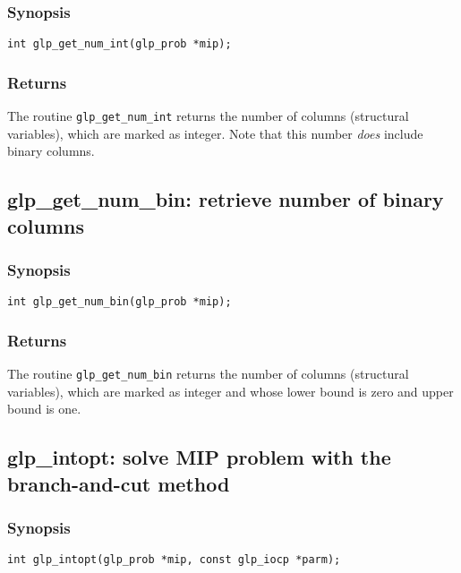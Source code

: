 \subsubsection*{Synopsis}

\begin{verbatim}
int glp_get_num_int(glp_prob *mip);
\end{verbatim}

\subsubsection*{Returns}

The routine \verb|glp_get_num_int| returns the number of columns
(structural variables), which are marked as integer. Note that this
number {\it does} include binary columns.

\subsection{glp\_get\_num\_bin: retrieve number of binary columns}

\subsubsection*{Synopsis}

\begin{verbatim}
int glp_get_num_bin(glp_prob *mip);
\end{verbatim}

\subsubsection*{Returns}

The routine \verb|glp_get_num_bin| returns the number of columns
(structural variables), which are marked as integer and whose lower
bound is zero and upper bound is one.

\subsection{glp\_intopt: solve MIP problem with the branch-and-cut
method}

\subsubsection*{Synopsis}

\begin{verbatim}
int glp_intopt(glp_prob *mip, const glp_iocp *parm);
\end{verbatim}

